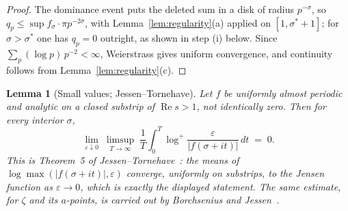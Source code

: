 \documentclass[11pt]{article}
\numberwithin{equation}{section}
\theoremstyle{plain}
\newtheorem{lemma}[theorem]{Lemma}
\theoremstyle{definition}
\theoremstyle{remark}
\begin{document}
\begin{proof}
The dominance event puts the deleted sum in a disk of radius $p^{-\sigma}$, so
$q_p \le \sup f_\sigma \cdot \pi p^{-2\sigma}$, with
Lemma~\ref{lem:regularity}(a) applied on $[1, \sigma^{*}+1]$; for
$\sigma > \sigma^{*}$ one has $q_p = 0$ outright, as shown in step (i) below. Since
$\sum_p (\log p)\, p^{-2} < \infty$, Weierstrass gives uniform convergence, and
continuity follows from Lemma~\ref{lem:regularity}(c).
\end{proof}

\begin{lemma}[Small values; Jessen--Tornehave]\label{lem:smallvalues}
Let $f$ be uniformly almost periodic and analytic on a closed substrip of
$\operatorname{Re} s > 1$, not identically zero. Then for every interior $\sigma$,
\[
\lim_{\varepsilon \downarrow 0}\; \limsup_{T \to \infty}\;
\frac1T \int_0^T \log^{+}\!\frac{\varepsilon}{|f(\sigma + it)|}\, dt \;=\; 0 .
\]
This is Theorem~5 of Jessen--Tornehave~\cite{jessentornehave}: the means of
$\log\max(|f(\sigma+it)|, \varepsilon)$ converge, uniformly on substrips, to the
Jensen function as $\varepsilon \to 0$, which is exactly the displayed statement.
The same estimate, for $\zeta$ and its $a$-points, is carried out by Borchsenius and
Jessen~\cite{borchsenius}.
\end{lemma}
\end{document}

